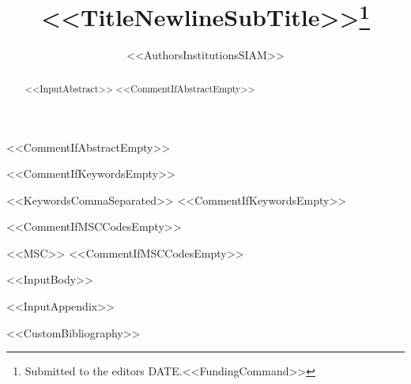 \documentclass[%
review,
onefignum,
onetabnum,
<<DocumentClassOptions>>]{siamonline250106}
\title{<<TitleNewlineSubTitle>>\thanks{Submitted to the editors DATE.<<FundingCommand>>}}
\author{%
<<AuthorsInstitutionsSIAM>>
}
\begin{document}
\maketitle

<<CommentIfAbstractEmpty>>\begin{abstract}
<<InputAbstract>>
<<CommentIfAbstractEmpty>>\end{abstract}

<<CommentIfKeywordsEmpty>>\begin{keywords}
<<KeywordsCommaSeparated>>
<<CommentIfKeywordsEmpty>>\end{keywords}

<<CommentIfMSCCodesEmpty>>\begin{MSCcodes}
<<MSC>>
<<CommentIfMSCCodesEmpty>>\end{MSCcodes}

<<InputBody>>

\appendix
<<InputAppendix>>


<<CustomBibliography>>
\end{document}
